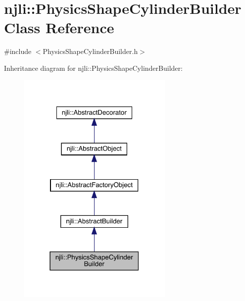 \hypertarget{classnjli_1_1_physics_shape_cylinder_builder}{}\section{njli\+:\+:Physics\+Shape\+Cylinder\+Builder Class Reference}
\label{classnjli_1_1_physics_shape_cylinder_builder}


{\ttfamily \#include $<$Physics\+Shape\+Cylinder\+Builder.\+h$>$}



Inheritance diagram for njli\+:\+:Physics\+Shape\+Cylinder\+Builder\+:\nopagebreak
\begin{figure}[H]
\begin{center}
\leavevmode
\includegraphics[width=214pt]{classnjli_1_1_physics_shape_cylinder_builder__inherit__graph}
\end{center}
\end{figure}


